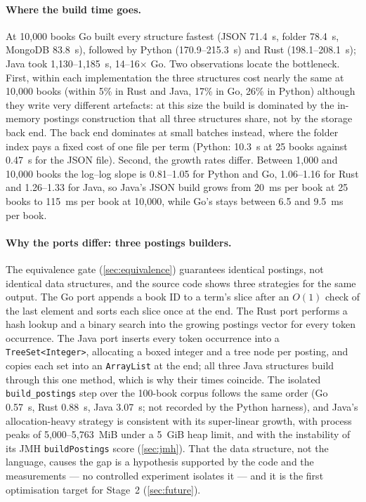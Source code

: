 \paragraph{Where the build time goes.}
At 10{,}000 books Go built every structure fastest (JSON 71.4~s, folder
78.4~s, MongoDB 83.8~s), followed by Python (170.9--215.3~s) and Rust
(198.1--208.1~s); Java took 1{,}130--1{,}185~s, 14--16$\times$ Go. Two
observations locate the bottleneck. First, within each implementation the
three structures cost nearly the same at 10{,}000 books (within 5\% in Rust
and Java, 17\% in Go, 26\% in Python) although they write very different
artefacts: at this size the build is dominated by the in-memory postings
construction that all three structures share, not by the storage back end.
The back end dominates at small batches instead, where the folder index pays
a fixed cost of one file per term (Python: 10.3~s at 25 books against
0.47~s for the JSON file). Second, the growth rates differ. Between 1{,}000
and 10{,}000 books the log--log slope is 0.81--1.05 for Python and Go,
1.06--1.16 for Rust and 1.26--1.33 for Java, so Java's JSON build grows from
20~ms per book at 25 books to 115~ms per book at 10{,}000, while Go's stays
between 6.5 and 9.5~ms per book.

\paragraph{Why the ports differ: three postings builders.}
The equivalence gate (\cref{sec:equivalence}) guarantees identical postings,
not identical data structures, and the source code shows three strategies
for the same output. The Go port appends a book ID to a term's slice after
an $O(1)$ check of the last element and sorts each slice once at the end. The
Rust port performs a hash lookup and a binary search into the growing
postings vector for every token occurrence. The Java port inserts every token
occurrence into a \texttt{TreeSet<Integer>}, allocating a boxed integer and
a tree node per posting, and copies each set into an \texttt{ArrayList} at
the end; all three Java structures build through this one method, which is
why their times coincide. The isolated \texttt{build\_postings} step over the
100-book corpus follows the same order (Go 0.57~s, Rust 0.88~s, Java 3.07~s;
not recorded by the Python harness), and Java's allocation-heavy strategy is
consistent with its super-linear growth, with process peaks of
5{,}000--5{,}763~MiB under a 5~GiB heap limit, and with the instability of
its JMH \texttt{buildPostings} score (\cref{sec:jmh}). That the data
structure, not the language, causes the gap is a hypothesis supported by
the code and the measurements --- no controlled experiment isolates it ---
and it is the first optimisation target for Stage~2 (\cref{sec:future}).

